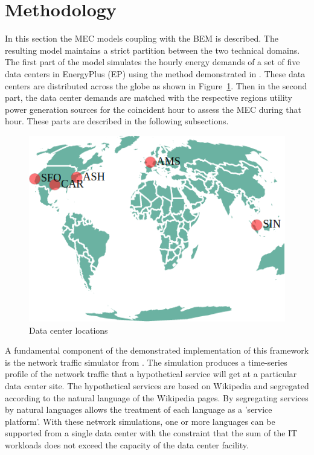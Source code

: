 \section{Methodology}
In this section the MEC model\textsc{}s coupling with the BEM is described. The resulting model maintains a strict partition between the two technical domains. The first part of the model simulates the hourly energy demands of a set of five data centers in EnergyPlus (EP) using the method demonstrated in \citep{kumar20}. These data centers are distributed across the globe as shown in Figure~\ref{fig:dc_locations}. Then in the second part, the data center demands are matched with the respective region\textsc{}s utility power generation sources for the coincident hour to assess the MEC during that hour. These parts are described in the following subsections. 

\begin{figure}
  \centering
  \includegraphics[scale=.40]{marginal_energy_cost/img/dc_locations.png}
  \caption{Data center locations}
  \label{fig:dc_locations}
  \end{figure}

A fundamental component of the demonstrated implementation of this framework is the network traffic simulator from \citep{kumar20}. The simulation produces a time-series profile of the network traffic that a hypothetical service will get at a particular data center site. The hypothetical services are based on Wikipedia and segregated according to the natural language of the Wikipedia pages. By segregating services by natural languages allows the treatment of each language as a 'service platform'. With these network simulations, one or more languages can be supported from a single data center with the constraint that the sum of the IT workloads does not exceed the capacity of the data center facility. 

